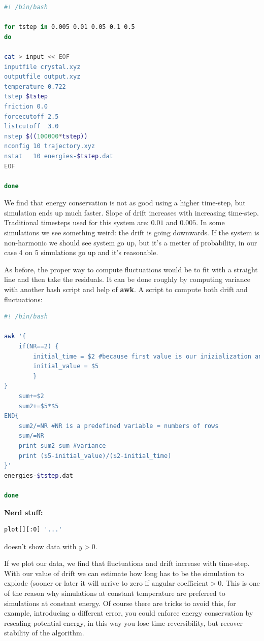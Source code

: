 \documentclass[a4paper, italian, openany]{book}
\begin{document}
\begin{lstlisting}[language=bash]
#! /bin/bash

for tstep in 0.005 0.01 0.05 0.1 0.5
do

cat > input << EOF
inputfile crystal.xyz
outputfile output.xyz
temperature 0.722
tstep $tstep
friction 0.0
forcecutoff 2.5
listcutoff  3.0
nstep $((100000*tstep))
nconfig 10 trajectory.xyz
nstat   10 energies-$tstep.dat
EOF

done
\end{lstlisting}

We find that energy conservation is not as good using a higher time-step, but simulation ends up much faster. Slope of drift increases with increasing time-step. Traditional timesteps used for this system are: $0.01$ and $0.005$.\newline
In some simulations we see something weird: the drift is going downwards. If the system is non-harmonic we should see system go up, but it's a metter of probability, in our case 4 on 5 simulations go up and it's reasonable.

\medskip

As before, the proper way to compute fluctuations would be to fit with a straight line and then take the residuals. It can be done roughly by computing variance with another bash script and help of \textbf{awk}.  A script to compute both drift and fluctuations:


\begin{lstlisting}[language=bash]
#! /bin/bash

awk '{
    if(NR==2) {
        initial_time = $2 #because first value is our inizialization and can lead to spurious results.
        initial_value = $5
        }
}
    sum+=$2
    sum2+=$5*$5
END{
    sum2/=NR #NR is a predefined variable = numbers of rows
    sum/=NR
    print sum2-sum #variance
    print ($5-initial_value)/($2-initial_time)
}' 
energies-$tstep.dat

done
\end{lstlisting}

\medskip

\textbf{Nerd stuff:} 
\begin{lstlisting}[language=bash]
plot[][:0] '...'
\end{lstlisting}

doesn't show data with $y > 0$.

\medskip

If we plot our data, we find that fluctuations and drift increase with time-step. With our value of drift we can estimate how long has to be the simulation to explode (sooner or later it will arrive to zero if $\mbox{angular coefficient}>0$.\newline
This is one of the reason why simulations at constant temperature are preferred to simulations at constant energy. Of course there are tricks to avoid this, for example, introducing a different error, you could enforce energy conservation by rescaling potential energy, in this way you lose time-reversibility, but recover stability of the algorithm.
\end{document}
